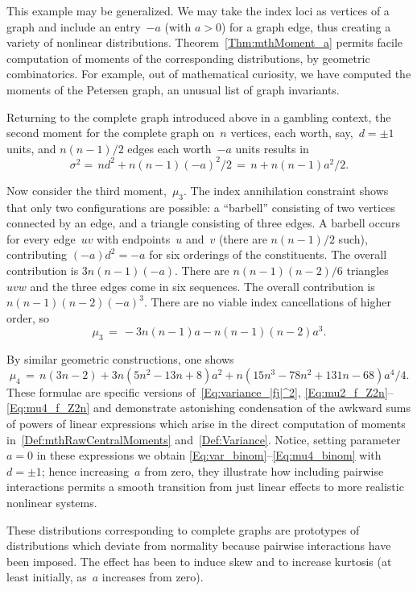 \documentclass[letterpaper,11pt]{article}
\newcommand{\gr}[1]{( #1 )}
\theoremstyle{definition} \newtheorem{remark}{Remark}
\begin{document}
This example may be generalized. We may take the index loci as vertices of a graph and include an entry~$-a$ (with $a>0$) for a graph edge, thus creating a variety of nonlinear distributions. Theorem~\ref{Thm:mthMoment_a} permits facile computation of moments of the corresponding distributions, by geometric combinatorics. For example, out of mathematical curiosity, we have computed the moments of the Petersen graph, an unusual list of graph invariants.

Returning to the complete graph introduced above in a gambling context, the second moment for the complete graph on~$n$ vertices, each worth, say,~$d = \pm1$ units, and $n\gr{n-1}/2$ edges each worth~$-a$ units results in
$$
\sigma^2 =\, nd^2 + {n\gr{n-1}} \gr{-a}^2/2 \,=\, n + {n\gr{n-1}} a^2/2.
$$

Now consider the third moment,~$\mu_3$. The index annihilation constraint shows that only two configurations are possible: a ``barbell'' consisting of two vertices connected by an edge, and a triangle consisting of three edges. A barbell occurs for every edge~$uv$ with  endpoints~$u$ and~$v$ (there are $n\gr{n-1}/2$ such), contributing $\gr{-a}d^2 = -a$ for six orderings of the constituents. The overall contribution is $3n\gr{n-1}\gr{-a}$. There are $n\gr{n-1}\gr{n-2}/6$ triangles $uvw$ and the three edges come in six sequences. The overall contribution is $n\gr{n-1}\gr{n-2}\gr{-a}^3$. There are no viable index cancellations of higher order, so
$$
\mu_3 \,=\, -3n\gr{n-1}a - n\gr{n-1}\gr{n-2}a^3.
$$

By similar geometric constructions, one shows
$$
\mu_4 \,=\, n\gr{3n-2} + 3n\gr{5n^2 - 13n + 8}a^2 + n\gr{15n^3 - 78n^2 + 131n - 68}a^4/4.
$$
These formulae are specific versions of~\eqref{Eq:variance_|fj|^2}, \eqref{Eq:mu2_f_Z2n}--\eqref{Eq:mu4_f_Z2n} and demonstrate astonishing condensation of the awkward sums of powers of linear expressions which arise in the direct computation of moments in~\eqref{Def:mthRawCentralMoments} and~\eqref{Def:Variance}. Notice, setting parameter~$a=0$ in these expressions we obtain \eqref{Eq:var_binom}--\eqref{Eq:mu4_binom} with $d=\pm1$; hence increasing~$a$ from zero, they illustrate how including pairwise interactions permits a smooth transition from just linear effects to more realistic nonlinear systems.

These distributions corresponding to complete graphs are prototypes of distributions which deviate from normality because pairwise interactions have been imposed. The effect has been to induce skew and to increase kurtosis (at least initially, as~$a$ increases from zero).
\end{document}
